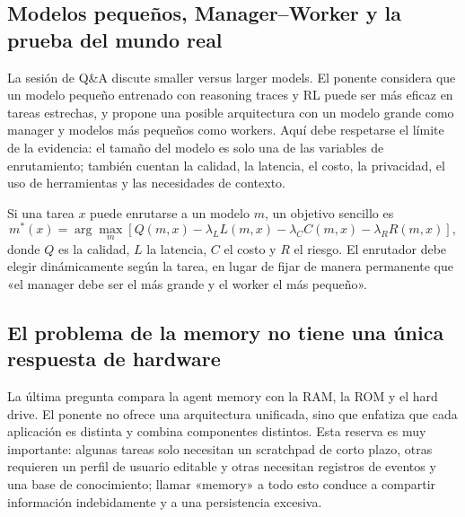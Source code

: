 \subsection{Modelos pequeños, Manager--Worker y la prueba del mundo real}

La sesión de Q\&A discute smaller versus larger models. El ponente considera que un modelo pequeño entrenado con reasoning traces y RL puede ser más eficaz en tareas estrechas, y propone una posible arquitectura con un modelo grande como manager y modelos más pequeños como workers. Aquí debe respetarse el límite de la evidencia: el tamaño del modelo es solo una de las variables de enrutamiento; también cuentan la calidad, la latencia, el costo, la privacidad, el uso de herramientas y las necesidades de contexto.


Si una tarea $x$ puede enrutarse a un modelo $m$, un objetivo sencillo es
\[
m^*(x)=\arg\max_m\left[
Q(m,x)-\lambda_L L(m,x)-\lambda_C C(m,x)-\lambda_R R(m,x)
\right],
\]
donde $Q$ es la calidad, $L$ la latencia, $C$ el costo y $R$ el riesgo. El enrutador debe elegir dinámicamente según la tarea, en lugar de fijar de manera permanente que «el manager debe ser el más grande y el worker el más pequeño».

\subsection{El problema de la memory no tiene una única respuesta de hardware}

La última pregunta compara la agent memory con la RAM, la ROM y el hard drive. El ponente no ofrece una arquitectura unificada, sino que enfatiza que cada aplicación es distinta y combina componentes distintos. Esta reserva es muy importante: algunas tareas solo necesitan un scratchpad de corto plazo, otras requieren un perfil de usuario editable y otras necesitan registros de eventos y una base de conocimiento; llamar «memory» a todo esto conduce a compartir información indebidamente y a una persistencia excesiva.


